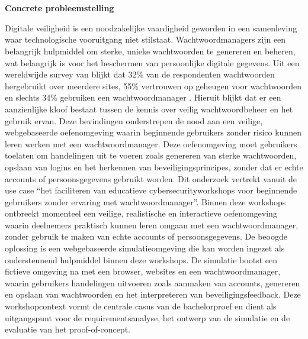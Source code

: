 
\chapter{}%
\label{ch:inleiding}

\textbf{Concrete probleemstelling}

Digitale veiligheid is een noodzakelijke vaardigheid geworden in een samenleving waar technologische vooruitgang niet stilstaat. Wachtwoordmanagers zijn een belangrijk hulpmiddel om sterke, unieke wachtwoorden te genereren en beheren, wat belangrijk is voor het beschermen van persoonlijke digitale gegevens. 
Uit een wereldwijde survey van \textcite{Bitwarden2022} blijkt dat 32\% van de respondenten wachtwoorden hergebruikt over meerdere sites, 55\% vertrouwen op geheugen voor wachtwoorden en slechts 34\% gebruiken een wachtwoordmanager \autocite{Bitwarden2022}. Hieruit blijkt dat er een aanzienlijke kloof bestaat tussen de kennis over veilig wachtwoordbeheer en het gebruik ervan.
Deze bevindingen onderstrepen de nood aan een veilige, webgebaseerde oefenomgeving waarin beginnende gebruikers zonder risico kunnen leren werken met een wachtwoordmanager. Deze oefenomgeving moet gebruikers toelaten om handelingen uit te voeren zoals genereren van sterke wachtwoorden, opslaan van logins en het herkennen van beveiligingsprincipes, zonder dat er echte accounts of persoonsgegevens gebruikt worden.
Dit onderzoek vertrekt vanuit de use case ``het faciliteren van educatieve cyber\-security\-workshops voor beginnende gebruikers zonder ervaring met wachtwoordmanager''. Binnen deze workshops ontbreekt momenteel een veilige, realistische en interactieve oefenomgeving waarin deelnemers praktisch kunnen leren omgaan met een wachtwoordmanager, zonder gebruik te maken van echte accounts of persoonsgegevens.
De beoogde oplossing is een webgebaseerde simulatieomgeving die kan worden ingezet als ondersteunend hulpmiddel binnen deze workshops. De simulatie bootst een fictieve omgeving na met een browser, websites en een wachtwoordmanager, waarin gebruikers handelingen uitvoeren zoals aanmaken van accounts, genereren en opslaan van wachtwoorden en het interpreteren van beveiligingsfeedback. Deze workshopcontext vormt de centrale casus van de bachelorproef en dient als uitgangspunt voor de requirementsanalyse, het ontwerp van de simulatie en de evaluatie van het proof-of-concept.

